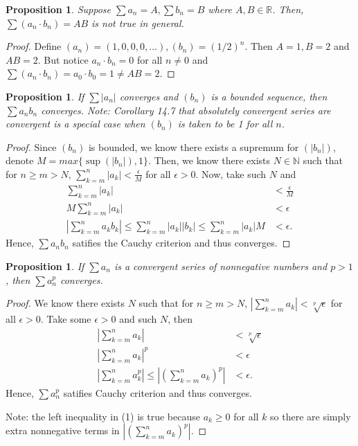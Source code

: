 \documentclass{article}
\newtheorem{proposition}[thm]{Proposition}
\begin{document}
\begin{proposition}
    Suppose $\sum a_n=A, \sum b_n=B$  where $A, B \in \mathbb{R}$. Then, $\sum (a_n\cdot b_n)=AB$
    is not true in general.
\end{proposition}
\begin{proof}
    Define $(a_n) = (1, 0, 0, 0, \dots), (b_n) = (1/2)^n$. Then $A=1, B=2$ and $AB = 2$. But notice 
    $a_n\cdot b_n = 0$ for all $n\neq 0$ and $\sum(a_n\cdot b_n) = a_0\cdot b_0 = 1\neq AB = 2$.
\end{proof}

\newpage
\begin{proposition}
    If $\sum|a_n|$ converges and $(b_n)$ is a bounded sequence, then $\sum a_nb_n$ converges.
    Note: Corollary 14.7 that absolutely convergent series are convergent is a special case when 
    $(b_n)$ is taken to be 1 for all $n$.
\end{proposition}
\begin{proof}
    Since $(b_n)$ is bounded, we know there exists a supremum for $(|b_n|)$, denote 
    $M = max\{\sup(|b_n|),1\}$. Then, we know there exists $N\in\mathbb{N}$ such that for $n\ge m>N$, 
    $\sum_{k=m}^n|a_k|<\frac{\epsilon}{M}$ for all $\epsilon>0$. Now, take such $N$ and
    \begin{align*}
        \sum_{k=m}^n|a_k| & < \frac{\epsilon}{M} \\
        M\sum_{k=m}^{n}|a_k| & < \epsilon \\
        \left|\sum_{k=m}^{n}a_kb_k\right| \le \sum_{k=m}^{n}|a_k||b_k| \le \sum_{k=m}^{n}|a_k|M & < \epsilon.
    \end{align*}
    Hence, $\sum a_nb_n$ satifies the Cauchy criterion and thus converges.
\end{proof}

\begin{proposition}
    If $\sum a_n$ is a convergent series of nonnegative numbers and $p>1$, then $\sum a^p_n$ 
    converges.
\end{proposition}
\begin{proof}
    We know there exists $N$ such that for $n\ge m>N$, 
    $\left|\sum_{k=m}^{n}a_k\right|<\sqrt[p]{\epsilon}$ for all $\epsilon>0$.
    Take some $\epsilon>0$ and such $N$, then
    \begin{align}
        \left|\sum_{k=m}^{n}a_k\right| & < \sqrt[p]{\epsilon} \nonumber \\
        \left|\sum_{k=m}^{n}a_k\right|^p & < \epsilon \nonumber \\
        \left|\sum_{k=m}^na_k^p\right| \le \left|\left(\sum_{k=m}^na_k\right)^p\right| & < \epsilon.
    \end{align}
    Hence, $\sum a_n^p$ satifies Cauchy criterion and thus converges.

    Note: the left inequality in (1) is true because $a_k\ge 0$ for all $k$ so there are simply extra 
    nonnegative terms in $\left|\left(\sum_{k=m}^na_k\right)^p\right|$.
\end{proof}
\end{document}
